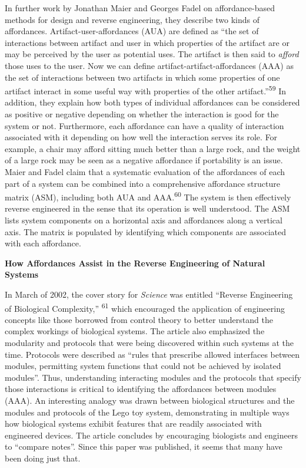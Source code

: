 In further work by Jonathan Maier and Georges Fadel on affordance-based
methods for design and reverse engineering, they describe two kinds of
affordances. Artifact-user-affordances (AUA) are defined as “the set of
interactions between artifact and user in which properties of the
artifact are or may be perceived by the user as potential uses. The
artifact is then said to \textit{afford} those uses to the user. Now we
can define artifact-artifact-affordances (AAA) as the set of
interactions between two artifacts in which some properties of one
artifact interact in some useful way with properties of the other
artifact.”\textsuperscript{59} In addition, they explain how both types
of individual affordances can be considered as positive or negative
depending on whether the interaction is good for the system or not.
Furthermore, each affordance can have a quality of interaction
associated with it depending on how well the interaction serves its
role. For example, a chair may afford sitting much better than a large
rock, and the weight of a large rock may be seen as a negative
affordance if portability is an issue. Maier and Fadel claim that a
systematic evaluation of the affordances of each part of a system can
be combined into a comprehensive affordance structure matrix (ASM),
including both AUA and AAA.\textsuperscript{60} The system is then
effectively reverse engineered in the sense that its operation is well
understood. The ASM lists system components on a horizontal axis and
affordances along a vertical axis. The matrix is populated by
identifying which components are associated with each affordance.


\bigskip


\textbf{How Affordances Assist in the Reverse Engineering of Natural
Systems}


In March of 2002, the cover story for \textit{Science} was entitled
“Reverse Engineering of Biological Complexity,”\textsuperscript{ 61}
which encouraged the application of engineering concepts like those
borrowed from control theory to better understand the complex workings
of biological systems. The article also emphasized the modularity and
protocols that were being discovered within such systems at the time.
Protocols were described as “rules that prescribe allowed interfaces
between modules, permitting system functions that could not be achieved
by isolated modules”. Thus, understanding interacting modules and the
protocols that specify those interactions is critical to identifying
the affordances between modules (AAA). An interesting analogy was drawn
between biological structures and the modules and protocols of the Lego
toy system, demonstrating in multiple ways how biological systems
exhibit features that are readily associated with engineered devices.
The article concludes by encouraging biologists and engineers to
“compare notes”. Since this paper was published, it seems that many
have been doing just that. 


